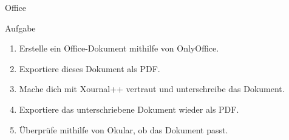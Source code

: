 \begin{frame}{Office}
    \vspace{0.5cm}
    \begin{alertblock}{Aufgabe}
        \begin{enumerate}
            \item Erstelle ein Office-Dokument mithilfe von OnlyOffice.
            \item Exportiere dieses Dokument als PDF.
            \item Mache dich mit Xournal++ vertraut und unterschreibe das Dokument.
            \item Exportiere das unterschriebene Dokument wieder als PDF.
            \item Überprüfe mithilfe von Okular, ob das Dokument passt.
        \end{enumerate}
    \end{alertblock}
\end{frame}
